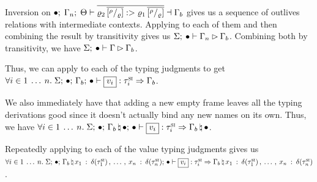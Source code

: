 \begin{preservation}
{    Inversion on $\bullet; \; \Gamma_n; \; \Theta \vdash \overline{
      \varrho_2 \, \overline{[ ^{\rho} / _{\varrho} ]}
     :> 
      \varrho_1 \, \overline{[ ^{\rho} / _{\varrho} ]}
    } \dashv \Gamma_b$ gives us a sequence of outlives relations with
    intermediate contexts. Applying   to each of
    them and then combining the result by transitivity gives us
    $\Sigma; \: \bullet \vdash \Gamma_n \rhd \Gamma_b$.
    Combining both by transitivity, we have
    $\Sigma; \: \bullet \vdash \Gamma \rhd \Gamma_b$.

    Thus, we can apply  to each of the
    typing judgments to get $\forall i \in 1 \oxdots n. \;
    \oxtypjudge{\oxglobalctx}{\oxemptyctx}{\oxemptyctx}{\oxvarctx_b}{
      \oxvalue_i
    }{\oxsitype_i}{\oxvarctx_b}$.

    We also immediately have that adding a new empty frame leaves all the typing
    derivations good since it doesn't actually bind any new names on its own.
    Thus, we have $\forall i \in 1 \oxdots n. \;
    \oxtypjudge{\oxglobalctx}{\oxemptyctx}{\oxemptyctx}{
      \oxnewframe{\oxvarctx_b}{\oxemptyctx}
    }{
      \oxvalue_i
    }{\oxsitype_i}{
      \oxnewframe{\oxvarctx_b}{\oxemptyctx}
    }$.

    Repeatedly applying  to each of the value
    typing judgments gives us
    $\forall i \in 1 \oxdots n. \;
    \oxtypjudge{\oxglobalctx}{\oxemptyctx}{\oxemptyctx}{
      \oxnewframe{\oxvarctx_b}{
        \oxvarctxentry{\oxid_1}{\delta(\oxsitype_1)} \oxdotsc
        \oxvarctxentry{\oxid_n}{\delta(\oxsitype_n)}
      }
    }{
      \oxvalue_i
    }{\oxsitype_i}{
      \oxnewframe{\oxvarctx_b}{
        \oxvarctxentry{\oxid_1}{\delta(\oxsitype_1)} \oxdotsc
        \oxvarctxentry{\oxid_n}{\delta(\oxsitype_n)}
      }
    }$.
  }

\end{preservation}
